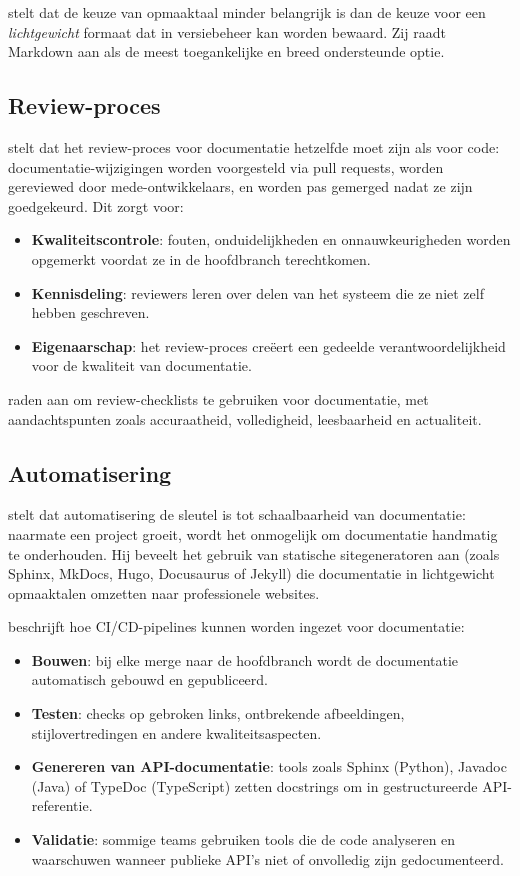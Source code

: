 \textcite{gentle2017docslikecode} stelt dat de keuze van opmaaktaal minder belangrijk is dan de keuze voor een \textit{lichtgewicht} formaat dat in versiebeheer kan worden bewaard. Zij raadt Markdown aan als de meest toegankelijke en breed ondersteunde optie.

\subsection{Review-proces}
\textcite{gentle2017docslikecode} stelt dat het review-proces voor documentatie hetzelfde moet zijn als voor code: documentatie-wijzigingen worden voorgesteld via pull requests, worden gereviewed door mede-ontwikkelaars, en worden pas gemerged nadat ze zijn goedgekeurd. Dit zorgt voor:

\begin{itemize}
    \item \textbf{Kwaliteitscontrole}: fouten, onduidelijkheden en onnauwkeurigheden worden opgemerkt voordat ze in de hoofdbranch terechtkomen.
    \item \textbf{Kennisdeling}: reviewers leren over delen van het systeem die ze niet zelf hebben geschreven.
    \item \textbf{Eigenaarschap}: het review-proces creëert een gedeelde verantwoordelijkheid voor de kwaliteit van documentatie.
\end{itemize}

\textcite{bhatti2021docsdevelopers} raden aan om review-checklists te gebruiken voor documentatie, met aandachtspunten zoals accuraatheid, volledigheid, leesbaarheid en actualiteit.

\subsection{Automatisering}
\textcite{etter2016moderntechwriting} stelt dat automatisering de sleutel is tot schaalbaarheid van documentatie: naarmate een project groeit, wordt het onmogelijk om documentatie handmatig te onderhouden. Hij beveelt het gebruik van statische sitegeneratoren aan (zoals Sphinx, MkDocs, Hugo, Docusaurus of Jekyll) die documentatie in lichtgewicht opmaaktalen omzetten naar professionele websites.

\textcite{gentle2017docslikecode} beschrijft hoe CI/CD-pipelines kunnen worden ingezet voor documentatie:

\begin{itemize}
    \item \textbf{Bouwen}: bij elke merge naar de hoofdbranch wordt de documentatie automatisch gebouwd en gepubliceerd.
    \item \textbf{Testen}: checks op gebroken links, ontbrekende afbeeldingen, stijlovertredingen en andere kwaliteitsaspecten.
    \item \textbf{Genereren van API-documentatie}: tools zoals Sphinx (Python), Javadoc (Java) of TypeDoc (TypeScript) zetten docstrings om in gestructureerde API-referentie.
    \item \textbf{Validatie}: sommige teams gebruiken tools die de code analyseren en waarschuwen wanneer publieke API's niet of onvolledig zijn gedocumenteerd.
\end{itemize}

